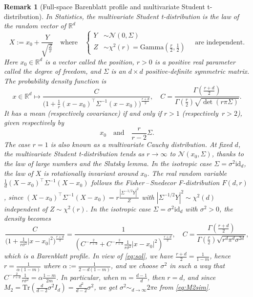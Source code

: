 \documentclass[10pt,reqno]{amsart}
\numberwithin{equation}{section}
\newtheorem{remark}[theorem]{Remark}%
\begin{document}
\begin{remark}[Full-space Barenblatt profile and multivariate Student t-distribution]\label{rk:student}
In Statistics, the multivariate Student t-distribution is the law of the random vector of $\mathbb{R}^d$
\begin{equation}
X:=x_0+\frac{Y}{\sqrt{\frac{Z}{r}} }
\quad\text{where}\quad
\begin{cases}
 Y&\sim\mathcal{N}(0,\Sigma)\\
 Z&\sim\chi^2(r)=\mathrm{Gamma}(\frac{r}{2},\frac{1}{2})
 \end{cases}
 \quad\text{are independent}.
\end{equation} 
Here $x_0\in\mathbb{R}^d$ is a vector called the position, $r>0$ is a positive
real parameter called the degree of freedom, and $\Sigma$ is an $d\times d$
positive-definite symmetric matrix. The probability density function is
\begin{equation}
    x\in\mathbb{R}^d\mapsto
    \frac{C}{\bigr(1+\frac{1}{r}(x-x_0)^\top\Sigma^{-1}(x-x_0)\bigr)^{\frac{r+d}{2}}},
    \quad
    C=\frac{\Gamma(\frac{r+d}{2})}
    {\Gamma(\frac{r}{2})\sqrt{\det(r\pi\Sigma)}}.
\end{equation}
It has a mean (respectively covariance) if and only if $r>1$ (respectively\ $r>2$), given respectively by 
\begin{equation}\label{eq:x0Sigma}
x_0\quad \text{and}\quad \frac{r}{r-2}\Sigma.
\end{equation}
The case $r=1$ is also known as a multivariate Cauchy distribution. At fixed $d$, the multivariate Student t-distribution tends as $r\to\infty$ to $\mathcal{N}(x_0,\Sigma)$, thanks to the law of large numbers and the Slutsky lemma. In the isotropic case $\Sigma=\sigma^2\mathrm{id}_d$, the law of $X$ is rotationally invariant around $x_0$. The real random variable $\frac{1}{d}(X-x_0)^\top\Sigma^{-1}(X-x_0)$ follows the Fisher\,--\,Snedecor F-distribution $F(d,r)$, since $(X-x_0)^\top\Sigma^{-1}(X-x_0)=r\frac{|\Sigma^{-1/2}Y|^2}{Z}$ with $|\Sigma^{-1/2}Y|^2\sim\chi^2(d)$ independent of $Z\sim\chi^2(r)$. In the isotropic case $\Sigma=\sigma^2\mathrm{id}_d$ with $\sigma^2>0$, the density becomes
\begin{equation}
      \frac{C}{\bigr(1+\frac{1}{r\sigma^2}\left|x-x_0\right|^2\bigr)^{\frac{r+d}{2}}}
    = \frac{1}{(C^{-\frac{2}{r+d}}+C^{-\frac{2}{r+d}}\frac{1}{r\sigma^2}\left|x-x_0\right|^2)^{\frac{r+d}{2}}},
    \quad
    C=\frac{\Gamma(\frac{r+d}{2})}
    {\Gamma(\frac{r}{2})\sqrt{r^d\pi^d\sigma^{2d}}},
\end{equation}
which is a Barenblatt profile. In view of \eqref{eq:sol}, we have $\frac{r+d}{2}=\frac{1}{1-m}$, hence $r=\frac{1}{\alpha(1-m)}$ where $\alpha:=\frac{1}{2-d(1-m)}$, and we choose $\sigma^2$ in such a way that $C^{-\frac{2}{r+d}}\frac{1}{r\sigma^2}=\alpha\frac{1-m}{2m}$. In particular, when $m=\frac{d-1}{d}$, then $r=d$, and since $M_2=\mathrm{Tr}(\frac{d}{d-2}\sigma^2I_d)=\frac{d^2}{d-2}\sigma^2$, we get $\sigma^2\sim_{d\to\infty}2\pi\mathrm{e}$ from \eqref{eq:M2sim}.
\end{remark}
\end{document}
